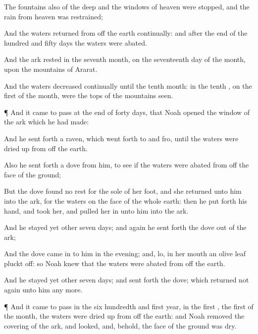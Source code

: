 {The
fountains also of the
deep and the
windows of
heaven were
stopped, and the
rain from
heaven was
restrained;

And the
waters
returned from off the
earth
continually: and after the
end of the
hundred and
fifty
days the
waters were
abated.


\par }{\PP {}And the
ark
rested in the
seventh
month, on the
seventeenth
day of the
month, upon the
mountains of
Ararat.

And the
waters
decreased
continually
until the
tenth
month: in the
tenth
{}, on the
first
{} of the
month, were the
tops of the
mountains
seen.


\par }{\PP {}¶ And it came to pass at the
end of
forty
days, that
Noah
opened the
window of the
ark which he had
made:

And he sent
forth a
raven, which went
forth
to and
fro, until the
waters were dried
up from off the
earth.

Also he sent
forth a
dove from him, to
see if the
waters were
abated from off the
face of the
ground;

But the
dove
found no
rest for the
sole of her
foot, and she
returned unto him into the
ark, for the
waters
{} on the
face of the whole
earth: then he put
forth his
hand, and took
her, and pulled her
in unto him into the
ark.

And he
stayed yet
other
seven
days; and
again he sent
forth the
dove out of the
ark;

And the
dove came
in to him in the
evening; and, lo, in her
mouth
{} an
olive
leaf pluckt
off: so
Noah
knew that the
waters were
abated from off the
earth.

And he
stayed yet
other
seven
days; and sent
forth the
dove; which
returned not
again unto him any
more.


\par }{\PP {}¶ And it came to pass in the
six
hundredth and first
year, in the
first
{}, the
first
{} of the
month, the
waters were dried
up from off the
earth: and
Noah
removed the
covering of the
ark, and
looked, and, behold, the
face of the
ground was
dry.

}

